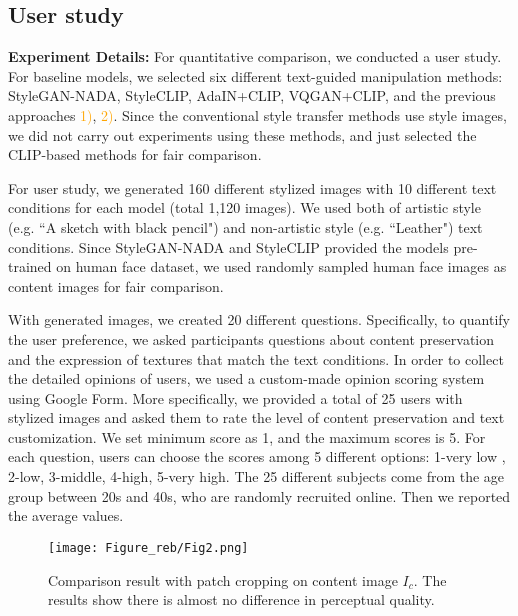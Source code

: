 \documentclass[10pt,twocolumn,letterpaper]{article}
\begin{document}
\subsection{User study}
\noindent\textbf{Experiment Details:} For quantitative comparison, we conducted a user study. For baseline models, we selected six different text-guided manipulation methods: StyleGAN-NADA\cite{nada}, StyleCLIP\cite{styleclip}, AdaIN+CLIP, VQGAN+CLIP, and the previous approaches \textcolor{orange}{1)}, \textcolor{orange}{2)}.  Since the conventional style transfer methods use style images, we did not carry out experiments using these methods, and just selected the CLIP-based methods for fair comparison. 

For user study, we generated 160 different stylized images with 10 different text conditions for each model (total 1,120 images). We used both of artistic style (e.g. ``A sketch with black pencil") and non-artistic style (e.g. ``Leather") text conditions.  Since StyleGAN-NADA and StyleCLIP provided the models pre-trained on human face dataset, we used randomly sampled human face images as content images for fair comparison. 

With generated images, we created 20 different questions. Specifically, to quantify the user preference, we asked  participants questions about content preservation and the expression of textures that match the text conditions. In order to collect the detailed opinions of users, we used a custom-made opinion scoring system using Google Form. More specifically, we provided a total of 25 users with stylized images and asked them to rate the level of content preservation and text customization.
 We set minimum score as 1, and the maximum scores is 5. For each question, users can choose the scores among 5 different options:  1-very low , 2-low, 3-middle, 4-high, 5-very high. The 25 different subjects come from the age group between 20s and 40s, who are randomly recruited online. Then we reported the average values.

\begin{figure*}[!t]

\centering
\texttt{[image: Figure\_reb/Fig2.png]}
\caption{Comparison result with patch cropping on content image $I_c$. The results show there is almost no difference in perceptual quality.}
\label{fig:content_crop}
\end{figure*}
\end{document}
